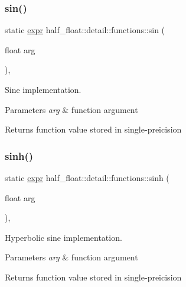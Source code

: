 \subsubsection{\texorpdfstring{sin()}{sin()}}
{\footnotesize\ttfamily static \hyperlink{structhalf__float_1_1detail_1_1expr}{expr} half\+\_\+float\+::detail\+::functions\+::sin (\begin{DoxyParamCaption}\item[{float}]{arg }\end{DoxyParamCaption})\hspace{0.3cm}{\ttfamily [inline]}, {\ttfamily [static]}}

Sine implementation. 
\begin{DoxyParams}{Parameters}
{\em arg} & function argument \\
\hline
\end{DoxyParams}
\begin{DoxyReturn}{Returns}
function value stored in single-\/preicision 
\end{DoxyReturn}
\mbox{\label{structhalf__float_1_1detail_1_1functions_a2fb1e87f5a6c136bd7ffd0d6c4400a7e}} 
\subsubsection{\texorpdfstring{sinh()}{sinh()}}
{\footnotesize\ttfamily static \hyperlink{structhalf__float_1_1detail_1_1expr}{expr} half\+\_\+float\+::detail\+::functions\+::sinh (\begin{DoxyParamCaption}\item[{float}]{arg }\end{DoxyParamCaption})\hspace{0.3cm}{\ttfamily [inline]}, {\ttfamily [static]}}

Hyperbolic sine implementation. 
\begin{DoxyParams}{Parameters}
{\em arg} & function argument \\
\hline
\end{DoxyParams}
\begin{DoxyReturn}{Returns}
function value stored in single-\/preicision 
\end{DoxyReturn}
\mbox{\label{structhalf__float_1_1detail_1_1functions_af8d54d1d78867f658f35306e0588a7fd}} 
